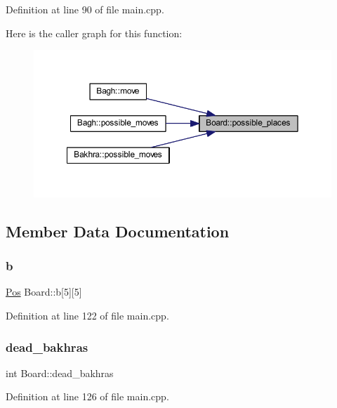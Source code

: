 Definition at line 90 of file main.\+cpp.

Here is the caller graph for this function\+:
\nopagebreak
\begin{figure}[H]
\begin{center}
\leavevmode
\includegraphics[width=350pt]{class_board_a50777989564d829d24dcd8aa63816dcb_icgraph}
\end{center}
\end{figure}


\subsection{Member Data Documentation}
\mbox{\label{class_board_a13f6c1dda93fa552f0620b7c0867df4e}} 
\subsubsection{\texorpdfstring{b}{b}}
{\footnotesize\ttfamily \mbox{\hyperlink{main_8cpp_a1fee34cd51bd05e4c433a7e94ed397db}{Pos}} Board\+::b\mbox{[}5\mbox{]}\mbox{[}5\mbox{]}}



Definition at line 122 of file main.\+cpp.

\mbox{\label{class_board_ab9b098ed92381fadccbdfa1e3cb273e8}} 
\subsubsection{\texorpdfstring{dead\_bakhras}{dead\_bakhras}}
{\footnotesize\ttfamily int Board\+::dead\+\_\+bakhras}



Definition at line 126 of file main.\+cpp.

